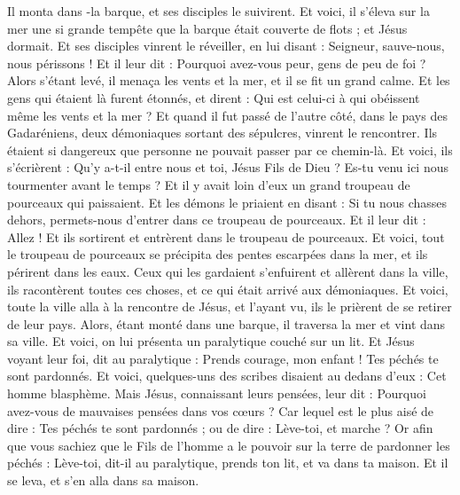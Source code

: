 \begin{multicols}{2}
Il monta dans -la barque, et ses disciples le suivirent.
Et voici, il s'éleva sur la mer une si grande tempête que la barque était couverte de flots ; et Jésus dormait.
Et ses disciples vinrent le réveiller, en lui disant : Seigneur, sauve-nous, nous périssons !
Et il leur dit : Pourquoi avez-vous peur, gens de peu de foi ? Alors s'étant levé, il menaça les vents et la mer, et il se fit un grand calme.
Et les gens qui étaient là furent étonnés, et dirent : Qui est celui-ci à qui obéissent même les vents et la mer ?
Et quand il fut passé de l'autre côté, dans le pays des Gadaréniens, deux démoniaques sortant des sépulcres, vinrent le rencontrer. Ils étaient si dangereux que personne ne pouvait passer par ce chemin-là.
Et voici, ils s'écrièrent : Qu'y a-t-il entre nous et toi, Jésus Fils de Dieu ? Es-tu venu ici nous tourmenter avant le temps ?
Et il y avait loin d'eux un grand troupeau de pourceaux qui paissaient.
Et les démons le priaient en disant : Si tu nous chasses dehors, permets-nous d’entrer dans ce troupeau de pourceaux.
Et il leur dit : Allez ! Et ils sortirent et entrèrent dans le troupeau de pourceaux. Et voici, tout le troupeau de pourceaux se précipita des pentes escarpées dans la mer, et ils périrent dans les eaux.
Ceux qui les gardaient s'enfuirent et allèrent dans la ville, ils racontèrent toutes ces choses, et ce qui était arrivé aux démoniaques.
Et voici, toute la ville alla à la rencontre de Jésus, et l'ayant vu, ils le prièrent de se retirer de leur pays.
\VerseOne{}Alors, étant monté dans une barque, il traversa la mer et vint dans sa ville.
Et voici, on lui présenta un paralytique couché sur un lit. Et Jésus voyant leur foi, dit au paralytique : Prends courage, mon enfant ! Tes péchés te sont pardonnés.
Et voici, quelques-uns des scribes disaient au dedans d’eux : Cet homme blasphème.
Mais Jésus, connaissant leurs pensées, leur dit : Pourquoi avez-vous de mauvaises pensées dans vos cœurs ?
Car lequel est le plus aisé de dire : Tes péchés te sont pardonnés ; ou de dire : Lève-toi, et marche ?
Or afin que vous sachiez que le Fils de l'homme a le pouvoir sur la terre de pardonner les péchés : Lève-toi, dit-il au paralytique, prends ton lit, et va dans ta maison.
Et il se leva, et s'en alla dans sa maison.

\end{multicols}
